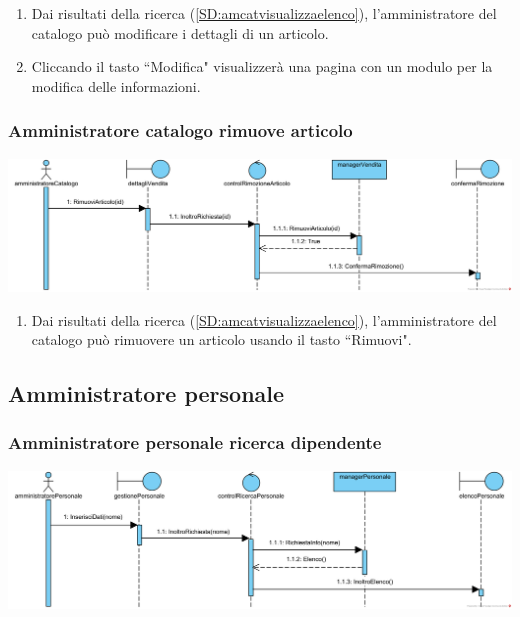 \documentclass[12pt,a4paper]{article}
\begin{document}
\begin{enumerate}
\item Dai risultati della ricerca (\ref{SD:amcatvisualizzaelenco}), l'amministratore del catalogo può modificare i dettagli di un articolo.
\item Cliccando il tasto ``Modifica" visualizzerà una pagina con un modulo per la modifica delle informazioni.
\end{enumerate}

\subsubsection{Amministratore catalogo rimuove articolo}
\label{SD:amcatrimuovearticolo}
\begin{center}
\includegraphics[width=\textwidth]{SequenceDiagram/AmministratoreCatalogoVenditaRimuove}
\end{center}

\begin{enumerate}
\item Dai risultati della ricerca (\ref{SD:amcatvisualizzaelenco}), l'amministratore del catalogo può rimuovere un articolo usando il tasto ``Rimuovi".
\end{enumerate}

\newpage

\subsection{Amministratore personale}
\subsubsection{Amministratore personale ricerca dipendente}
\label{SD:amperricerca}
\begin{center}
\includegraphics[width=\textwidth]{SequenceDiagram/AmministratorePersonaleDipendenteRicerca}
\end{center}
\end{document}
